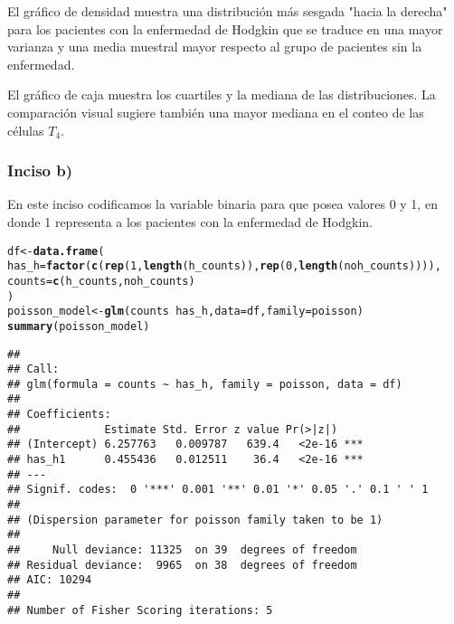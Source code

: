 \documentclass[paper=letter, fontsize=11pt, draft=false]{scrartcl}\usepackage[]{graphicx}\usepackage[]{xcolor}
\makeatletter
\newcommand{\hlnum}[1]{\textcolor[rgb]{0.686,0.059,0.569}{#1}}%
\newcommand{\hlopt}[1]{\textcolor[rgb]{0,0,0}{#1}}%
\newcommand{\hldef}[1]{\textcolor[rgb]{0.345,0.345,0.345}{#1}}%
\newcommand{\hlkwb}[1]{\textcolor[rgb]{0.69,0.353,0.396}{#1}}%
\newcommand{\hlkwc}[1]{\textcolor[rgb]{0.333,0.667,0.333}{#1}}%
\newcommand{\hlkwd}[1]{\textcolor[rgb]{0.737,0.353,0.396}{\textbf{#1}}}%
\newenvironment{kframe}{%
 \def\at@end@of@kframe{}%
 \ifinner\ifhmode%
  \def\at@end@of@kframe{\end{minipage}}%
  \begin{minipage}{\columnwidth}%
 \fi\fi%
 \def\FrameCommand##1{\hskip\@totalleftmargin \hskip-\fboxsep
 \colorbox{shadecolor}{##1}\hskip-\fboxsep
     \hskip-\linewidth \hskip-\@totalleftmargin \hskip\columnwidth}%
 \MakeFramed {\advance\hsize-\width
   \@totalleftmargin\z@ \linewidth\hsize
   \@setminipage}}%
 {\par\unskip\endMakeFramed%
 \at@end@of@kframe}
\newenvironment{knitrout}{}{} %
\numberwithin{equation}{problemcounter} %
\numberwithin{figure}{problemcounter} %
\numberwithin{table}{problemcounter} %
\numberwithin{subsection}{problemcounter}
\makeatother
\begin{document}
El gráfico de densidad muestra una distribución más sesgada "hacia la derecha" para los pacientes con la enfermedad de Hodgkin que se traduce en una mayor varianza y una media muestral mayor respecto al grupo de pacientes sin la enfermedad.

El gráfico de caja muestra los cuartiles y la mediana de las distribuciones. La comparación visual sugiere también una mayor mediana en el conteo de las células $T_4$.
\subsubsection*{Inciso b)}

En este inciso codificamos la variable binaria para que posea valores 0 y 1, en donde 1 representa a los pacientes con la enfermedad de Hodgkin.

\begin{knitrout}
\color{fgcolor}\begin{kframe}
\begin{alltt}
\hldef{df} \hlkwb{<-} \hlkwd{data.frame}\hldef{(}
  \hlkwc{has_h} \hldef{=} \hlkwd{factor}\hldef{(}\hlkwd{c}\hldef{(}\hlkwd{rep}\hldef{(}\hlnum{1}\hldef{,} \hlkwd{length}\hldef{(h_counts)),} \hlkwd{rep}\hldef{(}\hlnum{0}\hldef{,} \hlkwd{length}\hldef{(noh_counts)))),}
  \hlkwc{counts} \hldef{=} \hlkwd{c}\hldef{(h_counts, noh_counts)}
\hldef{)}
\hldef{poisson_model} \hlkwb{<-} \hlkwd{glm}\hldef{(counts} \hlopt{~} \hldef{has_h,} \hlkwc{data} \hldef{= df,} \hlkwc{family} \hldef{= poisson)}
\hlkwd{summary}\hldef{(poisson_model)}
\end{alltt}
\begin{verbatim}
## 
## Call:
## glm(formula = counts ~ has_h, family = poisson, data = df)
## 
## Coefficients:
##             Estimate Std. Error z value Pr(>|z|)    
## (Intercept) 6.257763   0.009787   639.4   <2e-16 ***
## has_h1      0.455436   0.012511    36.4   <2e-16 ***
## ---
## Signif. codes:  0 '***' 0.001 '**' 0.01 '*' 0.05 '.' 0.1 ' ' 1
## 
## (Dispersion parameter for poisson family taken to be 1)
## 
##     Null deviance: 11325  on 39  degrees of freedom
## Residual deviance:  9965  on 38  degrees of freedom
## AIC: 10294
## 
## Number of Fisher Scoring iterations: 5
\end{verbatim}
\end{kframe}
\end{knitrout}
\end{document}
